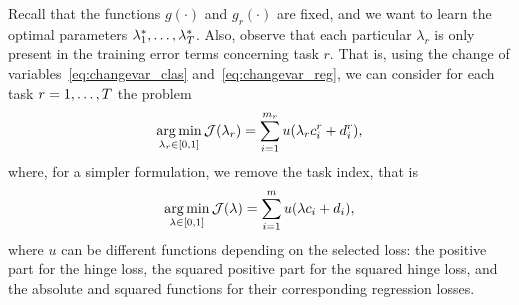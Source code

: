 Recall that the functions $g(\cdot)$ and $g_r(\cdot)$ are fixed, and we want to learn the optimal parameters $\lambda_1^*, \ldots, \lambda_T^*$. Also, observe that each particular $\lambda_r$ is only present in the training error terms concerning task $r$. That is, using the change of variables~\eqref{eq:changevar_clas} and~\eqref{eq:changevar_reg}, we can consider for each task $r=1, \ldots, T$ the problem
\begin{equation}
    \nonumber
    \operatorname*{arg\min}_{\lambda_r \in [0, 1]} \mathcal{J}(\lambda_r) = \sum_{i=1}^{m_r} u(\lambda_r c_i^r + d_i^r),
\end{equation}
where, for a simpler formulation, we remove the task index, that is 
\begin{equation}
    \label{eq:subproblem_lambda}
    \argmin_{\lambda \in [0, 1]} \mathcal{J}(\lambda) = \sum_{i=1}^{\npertask} u(\lambda c_i + d_i),
\end{equation}
where $u$ can be different functions depending on the selected loss: the positive part for the hinge loss, the squared positive part for the squared hinge loss, and the absolute and squared functions for their corresponding regression losses.

